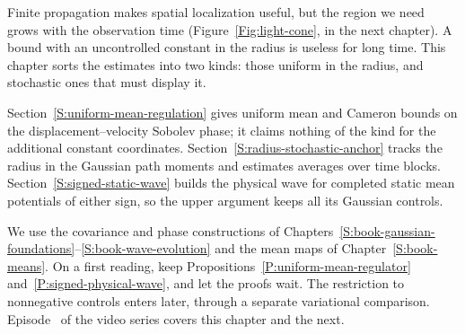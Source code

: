 Finite propagation makes spatial localization useful, but the region we need
grows with the observation time (Figure~\ref{Fig:light-cone}, in the next
chapter). A bound with an uncontrolled constant in the radius is useless for
long time. This chapter sorts the estimates into two kinds: those uniform
in the radius, and stochastic ones that must display it.

Section~\ref{S:uniform-mean-regulation} gives uniform mean and Cameron bounds
on the displacement--velocity Sobolev phase; it claims nothing of the kind for
the additional constant coordinates. Section~\ref{S:radius-stochastic-anchor}
tracks the radius in the Gaussian path moments and estimates averages over
time blocks. Section~\ref{S:signed-static-wave} builds the physical wave
for completed static mean potentials of either sign, so the upper argument
keeps all its Gaussian controls.

We use the covariance and phase constructions of
Chapters~\ref{S:book-gaussian-foundations}--\ref{S:book-wave-evolution}
and the mean maps of Chapter~\ref{S:book-means}. On a first reading, keep
Propositions~\ref{P:uniform-mean-regulator} and~\ref{P:signed-physical-wave},
and let the proofs wait. The restriction to nonnegative controls enters later,
through a separate variational comparison. Episode~
of the video series covers this chapter and the next.
